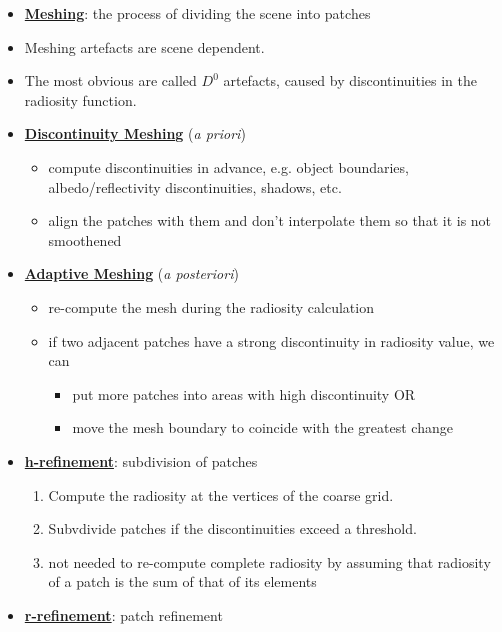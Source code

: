 \documentclass[twocolumn,landscape,10pt]{article}
\theoremstyle{definition}
\begin{document}
\begin{itemize}
    \item \underline{\textbf{Meshing}}: the process of dividing the scene into
        patches
    \item Meshing artefacts are scene dependent.
    \item The most obvious are called $D^0$ artefacts, caused by discontinuities
        in the radiosity function.
    \item \underline{\textbf{Discontinuity Meshing}} (\emph{a priori})
        \begin{itemize}
            \item compute discontinuities in advance, e.g. object boundaries,
                albedo/reflectivity discontinuities, shadows, etc.
            \item align the patches with them and don't interpolate them so that
                it is not smoothened
        \end{itemize} 
    \item \underline{\textbf{Adaptive Meshing}} (\emph{a posteriori})
        \begin{itemize}
            \item re-compute the mesh during the radiosity calculation
            \item if two adjacent patches have a strong discontinuity in
                radiosity value, we can
                \begin{itemize}
                    \item put more patches into areas with high discontinuity OR
                    \item move the mesh boundary to coincide with the greatest
                        change
                \end{itemize} 
        \end{itemize} 
    \item \underline{\textbf{h-refinement}}: subdivision of patches
        \begin{enumerate}
            \item Compute the radiosity at the vertices of the coarse grid.
            \item Subvdivide patches if the discontinuities exceed a threshold.
            \item not needed to re-compute complete radiosity by assuming that
            radiosity of a patch is the sum of that of its elements
    \end{enumerate} 
    \item \underline{\textbf{r-refinement}}: patch refinement

\end{itemize}
\end{document}

